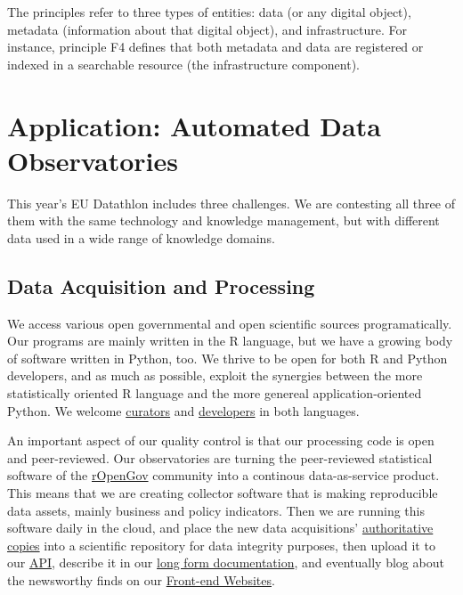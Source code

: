 \documentclass[
  a4paper,
  openany, a4paper, oneside]{book}
\begin{document}
The principles refer to three types of entities: data (or any digital object), metadata (information about that digital object), and infrastructure. For instance, principle F4 defines that both metadata and data are registered or indexed in a searchable resource (the infrastructure component).

\hypertarget{app}{%
\chapter{Application: Automated Data Observatories}\label{app}}

This year's EU Datathlon includes three challenges. We are contesting all three of them with the same technology and knowledge management, but with different data used in a wide range of knowledge domains.

\hypertarget{data-acquisition-and-processing}{%
\section{Data Acquisition and Processing}\label{data-acquisition-and-processing}}

We access various open governmental and open scientific sources programatically. Our programs are mainly written in the R language, but we have a growing body of software written in Python, too. We thrive to be open for both R and Python developers, and as much as possible, exploit the synergies between the more statistically oriented R language and the more genereal application-oriented Python. We welcome \href{https://economy.dataobservatory.eu/authors/curator/}{curators} and \href{https://greendeal.dataobservatory.eu/authors/developer/}{developers} in both languages.

An important aspect of our quality control is that our processing code is open and peer-reviewed. Our observatories are turning the peer-reviewed statistical software of the \href{http://ropengov.org/}{rOpenGov} community into a continous data-as-service product. This means that we are creating collector software that is making reproducible data assets, mainly business and policy indicators. Then we are running this software daily in the cloud, and place the new data acquisitions' \protect\hyperlink{zenodo}{authoritative copies} into a scientific repository for data integrity purposes, then upload it to our \protect\hyperlink{api}{API}, describe it in our \protect\hyperlink{bookdown}{long form documentation}, and eventually blog about the newsworthy finds on our \protect\hyperlink{hugo}{Front-end Websites}.
\end{document}
